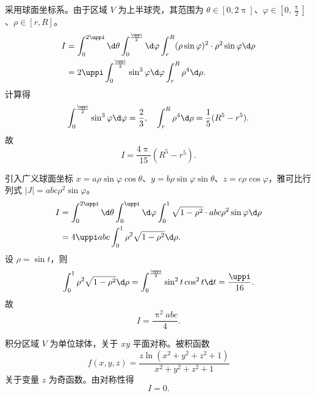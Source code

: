 \begin{solution}
    采用球面坐标系。由于区域 $V$ 为上半球壳，其范围为 $\theta \in [0, 2\uppi]$、$\varphi \in [0, \frac{\uppi}{2}]$、$\rho \in [r, R]$。
    \begin{equation}
        \begin{aligned}
            I & = \int_{0}^{2\uppi} \d \theta \int_{0}^{\frac{\uppi}{2}} \d \varphi \int_{r}^{R} (\rho \sin \varphi)^{2} \cdot \rho^{2} \sin \varphi \d \rho \\
              & = 2\uppi \int_{0}^{\frac{\uppi}{2}} \sin^{3} \varphi \d \varphi \int_{r}^{R} \rho^{4} \d \rho.
        \end{aligned}
    \end{equation}
    计算得
    \begin{equation}
        \int_{0}^{\frac{\uppi}{2}} \sin^{3} \varphi \d \varphi = \frac{2}{3}, \quad \int_{r}^{R} \rho^{4} \d \rho = \frac{1}{5} (R^{5} - r^{5}).
    \end{equation}
    故
    \begin{equation}
        \boxed{I = \frac{4\uppi}{15} (R^{5} - r^{5})}.
    \end{equation}

    引入广义球面坐标 $x = a \rho \sin \varphi \cos \theta$、$y = b \rho \sin \varphi \sin \theta$、$z = c \rho \cos \varphi$，雅可比行列式 $|J| = abc \rho^{2} \sin \varphi$。
    \begin{equation}
        \begin{aligned}
            I & = \int_{0}^{2\uppi} \d \theta \int_{0}^{\uppi} \d \varphi \int_{0}^{1} \sqrt{1 - \rho^{2}} \cdot abc \rho^{2} \sin \varphi \d \rho \\
              & = 4\uppi abc \int_{0}^{1} \rho^{2} \sqrt{1 - \rho^{2}} \d \rho.
        \end{aligned}
    \end{equation}
    设 $\rho = \sin t$，则
    \begin{equation}
        \int_{0}^{1} \rho^{2} \sqrt{1 - \rho^{2}} \d \rho = \int_{0}^{\frac{\uppi}{2}} \sin^{2} t \cos^{2} t \d t = \frac{\uppi}{16}.
    \end{equation}
    故
    \begin{equation}
        \boxed{I = \frac{\uppi^{2} abc}{4}}.
    \end{equation}

    积分区域 $V$ 为单位球体，关于 $xy$ 平面对称。被积函数
    \begin{equation}
        f(x, y, z) = \frac{z \ln(x^{2} + y^{2} + z^{2} + 1)}{x^{2} + y^{2} + z^{2} + 1}
    \end{equation}
    关于变量 $z$ 为奇函数。由对称性得
    \begin{equation}
        \boxed{I = 0}.
    \end{equation}
\end{solution}

